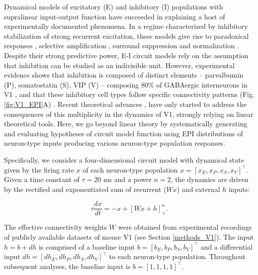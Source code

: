 \documentclass[11pt]{article}
\begin{document}
Dynamical models of excitatory (E) and inhibitory (I) populations with supralinear input-output function have succeeded in explaining a host of experimentally documented phenomena.
In a regime characterized by inhibitory stabilization of strong recurrent excitation, these models give rise to paradoxical responses \cite{tsodyks1997paradoxical}, selective amplification  \cite{murphy2009balanced}, surround suppression \cite{ozeki2009inhibitory} and normalization \cite{rubin2015stabilized}. 
Despite their strong predictive power, E-I circuit models rely on the assumption that inhibition can be studied as an indivisible unit. 
However, experimental evidence shows that inhibition is composed of distinct elements -- parvalbumin (P), somatostatin (S), VIP (V) --
composing 80\% of GABAergic interneurons in V1 \cite{markram2004interneurons, rudy2011three, tremblay2016}, and that these inhibitory cell types follow specific connectivity patterns (Fig. \ref{fig:V1_EPI}A) \cite{pfeffer2013inhibition}.
Recent theoretical advances \cite{litwin2016inhibitory, GarciaDelMolino2017, Chen2019},  have only started to address the consequences of this multiplicity in the dynamics of V1, strongly relying on linear theoretical tools. 
Here, we go beyond linear theory by systematically generating and evaluating hypotheses of circuit model function using EPI distributions of neuron-type inputs producing various neuron-type population responses.

Specifically, we consider a four-dimensional circuit model with dynamical state given by the firing rate $x$ of each neuron-type population $x = \left[x_E, x_P , x_S, x_V \right]^\top$. Given a time constant of $\tau = 20$ ms and a power $n = 2$, the dynamics are driven by the rectified and exponentiated sum of recurrent ($Wx$) and external $h$ inputs:

\begin{equation}
\tau \frac{dx}{dt} = -x + [W x+ h]_+^n.
\end{equation}

The effective connectivity weights $W$ were obtained from experimental recordings of publicly available datasets of mouse V1 \cite{allen2018layer, billeh2019systematic} (see Section \ref{methods_V1}).
The input $h = b + dh$ is comprised of a baseline input  $b = \left[ b_E, b_P , b_S , b_V \right]^\top$ and a differential input $dh = \left[ dh_E , dh_P , dh_S , dh_V\right]^\top$ to each neuron-type population.  
Throughout subsequent analyses, the baseline input is $b = \left[ 1 ,1,1,1\right]^\top$. 
\end{document}
